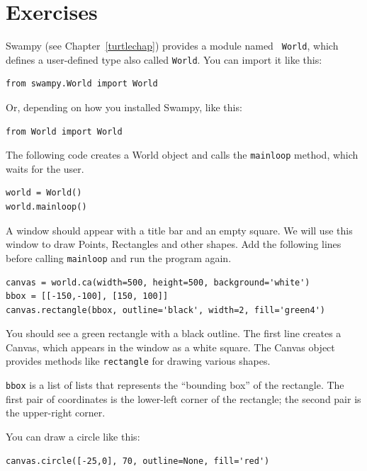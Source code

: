 \documentclass[10pt]{book}
\begin{document}
\section{Exercises}

\begin{exercise}
\label{canvas}

Swampy (see Chapter~\ref{turtlechap}) provides a module named {\tt
  World}, which defines a user-defined type also called {\tt World}.
You can import it like this:

\begin{verbatim}
from swampy.World import World
\end{verbatim}

Or, depending on how you installed Swampy, like this:

\begin{verbatim}
from World import World
\end{verbatim}

The following code creates a World object and calls
the {\tt mainloop} method, which
waits for the user.

\begin{verbatim}
world = World()
world.mainloop()
\end{verbatim}

A window should appear with a title bar and an empty square.
We will use this window to draw Points,
Rectangles and other shapes.
Add the following lines before calling
\verb"mainloop" and run the program again.

\begin{verbatim}
canvas = world.ca(width=500, height=500, background='white')
bbox = [[-150,-100], [150, 100]]
canvas.rectangle(bbox, outline='black', width=2, fill='green4')
\end{verbatim}

You should see a green rectangle with a black outline.
The first line creates a Canvas, which appears in the window
as a white square.  The Canvas object provides methods like
{\tt rectangle} for drawing various shapes.

{\tt bbox} is a list of lists that represents the ``bounding box''
of the rectangle.  The first pair of coordinates is the lower-left
corner of the rectangle; the second pair is the upper-right corner.

You can draw a circle like this:

\begin{verbatim}
canvas.circle([-25,0], 70, outline=None, fill='red')
\end{verbatim}


\end{exercise}
\end{document}
